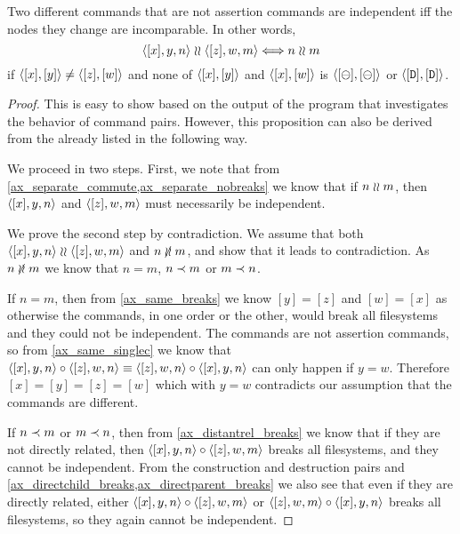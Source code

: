 \begin{mylem}\label{incomparable_is_independent}
Two different commands that are not assertion commands are independent iff the nodes they change are incomparable. In other words,
\[ \langle{[x],y,n}\rangle\mathrel{\wr\wr}\langle{[z],w,m}\rangle \Longleftrightarrow n\mathrel{\wr\wr} m \]
if $\langle{[x],[y]}\rangle\neq\langle{[z],[w]}\rangle$ and none of $\langle{[x],[y]}\rangle$ and $\langle{[x],[w]}\rangle$ is $\langle{[\ominus],[\ominus]}\rangle$ or $\langle{[\mathtt{D}],[\mathtt{D}]}\rangle$.
\end{mylem}
\begin{proof}
This is easy to show based on the output of the program that investigates the behavior of command pairs.
However, this proposition can also be derived from the  already listed
in the following way.

We proceed in two steps. First, we note that
from \cref{ax_separate_commute,ax_separate_nobreaks} we know that
if $n\mathrel{\wr\wr} m$, then $\langle{[x],y,n}\rangle$ and $\langle{[z],w,m}\rangle$ must necessarily be independent.

We prove the second step by contradiction.
We assume that both $\langle{[x],y,n}\rangle\mathrel{\wr\wr}\langle{[z],w,m}\rangle$ and $n\nunrel m$,
and show that it leads to contradiction.
As $n\nunrel m$
we know that $n=m$, $n\prec m$ or $m\prec n$.

If $n=m$, then from \cref{ax_same_breaks} we know $[y]=[z]$ and $[w]=[x]$
as otherwise the commands, in one order or the other, would break all filesystems
and they could not be independent.
The commands are not assertion commands, so from \cref{ax_same_singlec}
we know that $\langle{[x],y,n}\rangle\circ\langle{[z],w,n}\rangle\equiv\langle{[z],w,n}\rangle\circ\langle{[x],y,n}\rangle$ can only happen if $y=w$.
Therefore $[x]=[y]=[z]=[w]$ which with $y=w$ contradicts our assumption that the commands are different.

If $n\prec m$ or $m\prec n$, then
from \cref{ax_distantrel_breaks} we know that if they are not directly related,
then $\langle{[x],y,n}\rangle\circ\langle{[z],w,m}\rangle$ breaks all filesystems, and they cannot be independent.
From the construction and destruction pairs and 
\cref{ax_directchild_breaks,ax_directparent_breaks} we also see that
even if they are directly related, either
$\langle{[x],y,n}\rangle\circ\langle{[z],w,m}\rangle$ or $\langle{[z],w,m}\rangle\circ\langle{[x],y,n}\rangle$ 
breaks all filesystems, so they again cannot be independent.
\end{proof}

